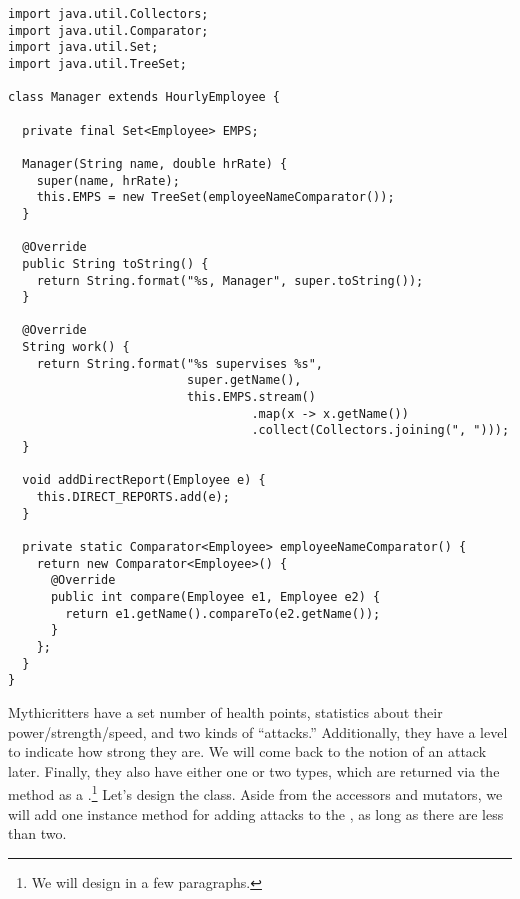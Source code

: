 \begin{lstlisting}[language=MyJava]
import java.util.Collectors;
import java.util.Comparator;
import java.util.Set;
import java.util.TreeSet;

class Manager extends HourlyEmployee {

  private final Set<Employee> EMPS;

  Manager(String name, double hrRate) {
    super(name, hrRate);
    this.EMPS = new TreeSet(employeeNameComparator());
  }

  @Override
  public String toString() {
    return String.format("%s, Manager", super.toString());
  }

  @Override
  String work() {
    return String.format("%s supervises %s", 
                         super.getName(),
                         this.EMPS.stream()
                                  .map(x -> x.getName())
                                  .collect(Collectors.joining(", ")));
  }

  void addDirectReport(Employee e) {
    this.DIRECT_REPORTS.add(e);
  }

  private static Comparator<Employee> employeeNameComparator() {
    return new Comparator<Employee>() {
      @Override
      public int compare(Employee e1, Employee e2) {
        return e1.getName().compareTo(e2.getName());
      }
    };
  }
}
\end{lstlisting}


Mythicritters have a set number of health points, statistics about their power/strength/speed, and two kinds of ``attacks.'' 
Additionally, they have a level to indicate how strong they are. 
We will come back to the notion of an attack later. 
Finally, they also have either one or two types, which are returned via the  method as a .\footnote{We will design  in a few paragraphs.} 
Let's design the  class. Aside from the accessors and mutators, we will add one instance method for adding attacks to the , as long as there are less than two. 


